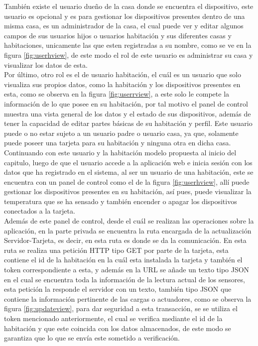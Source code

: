 También existe el usuario dueño de la casa donde se encuentra el dispositivo, este usuario es opcional y es para gestionar los dispositivos presentes dentro de una misma casa, es un administrador de la casa, el cual puede ver y editar algunos campos de sus usuarios hijos o usuarios habitación y sus diferentes casas y habitaciones, unicamente las que esten registradas a su nombre, como se ve en la figura \ref{fig:userhview}, de este modo el rol de este usuario es administrar su casa y visualizar los datos de esta.\\

Por último, otro rol es el de usuario habitación, el cuál es un usuario que solo visualiza sus propios datos, como la habitación y los dispositivos presentes en esta, como se observa en la figura \ref{fig:userrview}, a este solo le compete la información de lo que posee en su habitación, por tal motivo el panel de control muestra una vista general de los datos y el estado de sus dispositivos, además de tener la capacidad de editar partes básicas de su habitación y perfil. Este usuario puede o no estar sujeto a un usuario padre o usuario casa, ya que, solamente puede poseer una tarjeta para su habitación y ninguna otra en dicha casa.\\

Continuando con este usuario y la habitación modelo propuesta al inicio del capitulo, luego de que el usuario accede a la aplicación web e inicia sesión con los datos que ha registrado en el sistema, al ser un usuario de una habitación, este se encuentra con un panel de control como el de la figura \ref{fig:userhview}, allí puede gestionar los dispositivos presentes en su habitación, así pues, puede visualizar la temperatura que se ha sensado y también encender o apagar los dispositivos conectados a la tarjeta.\\

Además de este panel de control, desde el cuál se realizan las operaciones sobre la aplicación, en la parte privada se encuentra la ruta encargada de la actualización Servidor-Tarjeta, es decir, en esta ruta es donde se da la comunicación. En esta ruta se realiza una petición HTTP tipo GET por parte de la tarjeta, esta contiene el id de la habitación en la cuál esta instalada la tarjeta y también el token correspondiente a esta, y además en la URL se añade un texto tipo JSON en el cual se encuentra toda la información de la lectura actual de los sensores, esta petición la responde el servidor con un texto, también tipo JSON que contiene la información pertinente de las cargas o actuadores, como se observa la figura \ref{fig:updateview}, para dar seguridad a esta transacción, se se utiliza el token mencionado anteriormente, el cual se verifica mediante el id de la habitación y que este coincida con los datos almacenados, de este modo se garantiza que lo que se envía este sometido a verificación.\\

